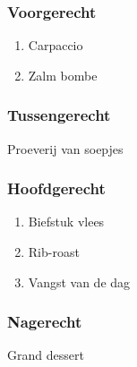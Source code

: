 \subsubsection*{Voorgerecht}
\begin{enumerate}
	\item Carpaccio
	\item Zalm bombe
\end{enumerate}

\subsubsection*{Tussengerecht}
Proeverij van soepjes

\subsubsection*{Hoofdgerecht}
\begin{enumerate}
	\item Biefstuk vlees
	\item Rib-roast
	\item Vangst van de dag
\end{enumerate}

\subsubsection*{Nagerecht}
Grand dessert
